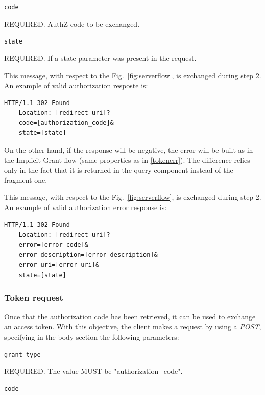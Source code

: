 \texttt{code}

\hspace{0.5cm}REQUIRED. AuthZ code to be exchanged.

\texttt{state}

\hspace{0.5cm}REQUIRED. If a state parameter was present in the request.

\vspace{0.5cm}

\noindent This message, with respect to the Fig.~\ref{fig:serverflow}, is exchanged during step 2. An example of valid authorization resposte is:

\begin{lstlisting}[basicstyle=\ttfamily]
  HTTP/1.1 302 Found
    Location: [redirect_uri]?
    code=[authorization_code]&
    state=[state]
\end{lstlisting}

\vspace{0.5cm}

On the other hand, if the response will be negative, the error will be built as in the Implicit Grant flow (same properties as in \ref{tokenerr}). The difference relies only in the fact that it is returned in the query component instead of the fragment one.

\noindent This message, with respect to the Fig.~\ref{fig:serverflow}, is exchanged during step 2. An example of valid authorization error response is:

\begin{lstlisting}[basicstyle=\ttfamily]
  HTTP/1.1 302 Found
    Location: [redirect_uri]?
    error=[error_code]&
    error_description=[error_description]&
    error_uri=[error_uri]&
    state=[state]
\end{lstlisting}

\subsubsection{Token request}
Once that the authorization code has been retrieved, it can be used to exchange an access token. With this objective, the client makes a request by using a \textit{POST}, specifying in the body section the following parameters:

\texttt{grant\_type}

\hspace{0.5cm}REQUIRED. The value MUST be "authorization\_code".

\texttt{code}

